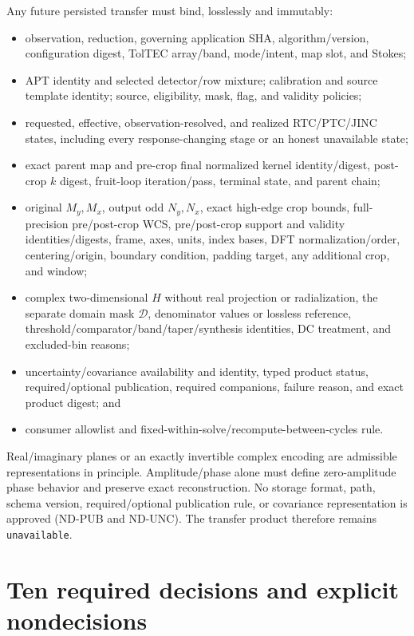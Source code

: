 \documentclass[11pt]{article}
\newcommand{\NA}{\texttt{unavailable}}
\begin{document}
Any future persisted transfer must bind, losslessly and immutably:
\begin{itemize}
\item observation, reduction, governing application SHA, algorithm/version,
configuration digest, TolTEC array/band, mode/intent, map slot, and Stokes;
\item APT identity and selected detector/row mixture; calibration and source
template identity; source, eligibility, mask, flag, and validity policies;
\item requested, effective, observation-resolved, and realized RTC/PTC/JINC
states, including every response-changing stage or an honest unavailable
state;
\item exact parent map and pre-crop final normalized kernel identity/digest,
post-crop $k$ digest, fruit-loop iteration/pass, terminal state, and parent
chain;
\item original $M_y,M_x$, output odd $N_y,N_x$, exact high-edge crop bounds,
full-precision pre/post-crop WCS, pre/post-crop support and validity
identities/digests, frame, axes, units, index bases, DFT normalization/order,
centering/origin,
boundary condition, padding target, any additional crop, and window;
\item complex two-dimensional $H$ without real projection or radialization,
the separate domain mask $\mathcal D$, denominator values or lossless
reference, threshold/comparator/band/taper/synthesis identities, DC treatment,
and excluded-bin reasons;
\item uncertainty/covariance availability and identity, typed product status,
required/optional publication, required companions, failure reason, and exact
product digest; and
\item consumer allowlist and fixed-within-solve/recompute-between-cycles rule.
\end{itemize}

Real/imaginary planes or an exactly invertible complex encoding are admissible
representations in principle.  Amplitude/phase alone must define zero-amplitude
phase behavior and preserve exact reconstruction.  No storage format, path,
schema version, required/optional publication rule, or covariance
representation is approved (ND-PUB and ND-UNC).  The transfer product therefore
remains \NA.

\section{Ten required decisions and explicit nondecisions}
\end{document}
